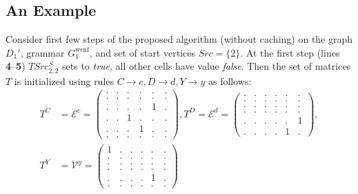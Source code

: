 \subsection{An Example}

Consider first few steps of the proposed algorithm (without caching) on the graph $D_1'$, grammar $G_1^{\text{wcnf}}$, and set of start vertices $Src = \{2\}$.
At the first step (lines \textbf{4}--\textbf{5}) $TSrc^S_{2,2}$ sets to \textit{true}, all other cells have value \textit{false}.
Then the set of matrices $T$ is initialized using rules $C \to c, D \to d, Y \to y$ as follows:
{
    \renewcommand{\arraystretch}{0.7}
    \setlength\arraycolsep{2pt}
\begin{align*}
    T^C& = \mathcal{E}^c =
    \begin{pmatrix}
    . & . & . & . & . & . \\
    . & . & . & . & . & . \\
    . & . & . & . & 1 & . \\
    . & . & 1 & . & . & . \\ 
    . & . & . & 1 & . & . \\ 
    . & . & . & . & . & .
\end{pmatrix},
    T^D = \mathcal{E}^d = 
    \begin{pmatrix}
    . & . & . & . & . & . \\
    . & . & . & . & . & . \\
    . & . & . & . & . & . \\
    . & . & . & . & . & . \\ 
    . & . & . & . & . & 1 \\ 
    . & . & . & . & 1 & .
\end{pmatrix},\\
    T^Y& = \mathcal{V}^y = 
    \begin{pmatrix}
    1 & . & . & . & . & . \\
    . & . & . & . & . & . \\
    . & . & . & . & . & . \\
    . & . & . & . & . & . \\ 
    . & . & . & . & 1 & . \\ 
    . & . & . & . & . & .
\end{pmatrix}
\end{align*}
}

